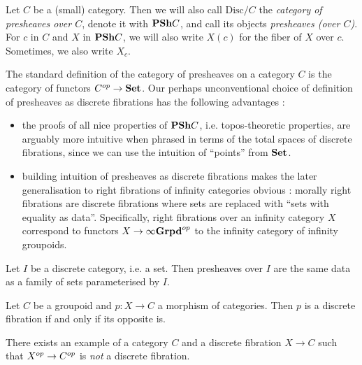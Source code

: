 \documentclass{article}
\begin{document}
\begin{dfn}
  
  Let $ C$ be a (small) category.
  Then we will also call $\mathrm{Disc}/ C$ the
  \emph{category of presheaves over $ C$},
  denote it with $\mathbf{PSh} C$,
  and call its objects \emph{presheaves (over $ C$)}.
  For $c$ in $C$ and $X$ in $\mathbf{PSh} C$,
  we will also write $X(c)$ for the fiber of $X$ over $c$.
  Sometimes, we also write $X_c$.
\end{dfn}

\begin{rmk}
  The standard definition of the category of presheaves on a category $C$
  is the category of functors $C^{op} \to \mathbf{Set}$.
  Our perhaps unconventional choice of definition of presheaves as
  discrete fibrations has the following advantages : 
  \begin{itemize}
    \item the proofs of all nice properties of $\mathbf{PSh} C$,
    i.e. topos-theoretic properties, are arguably more intuitive
    when phrased in terms of the total spaces of discrete fibrations,
    since we can use the intuition of ``points'' from $\mathbf{Set}$.
    \item building intuition of presheaves as discrete fibrations
    makes the later generalisation to right fibrations of infinity categories
    obvious : 
    morally right fibrations are discrete fibrations
    where sets are replaced with ``sets with equality as data''.
    Specifically,
    right fibrations over an infinity category $X$
    correspond to functors $X \to \infty\mathbf{Grpd}^{op}$
    to the infinity category of infinity groupoids.
  \end{itemize}
\end{rmk}

\begin{eg}
  
  Let $I$ be a discrete category, i.e. a set.
  Then presheaves over $I$ are the same data as
  a family of sets parameterised by $I$.
\end{eg}

\begin{eg}
  Let $C$ be a groupoid and $p : X \to C$ a morphism of categories.
  Then $p$ is a discrete fibration if and only if its opposite is.

  There exists an example of a category $C$ and a discrete fibration $X \to C$
  such that $X^{op} \to C^{op}$ is \emph{not} a discrete fibration.
\end{eg}
\end{document}
